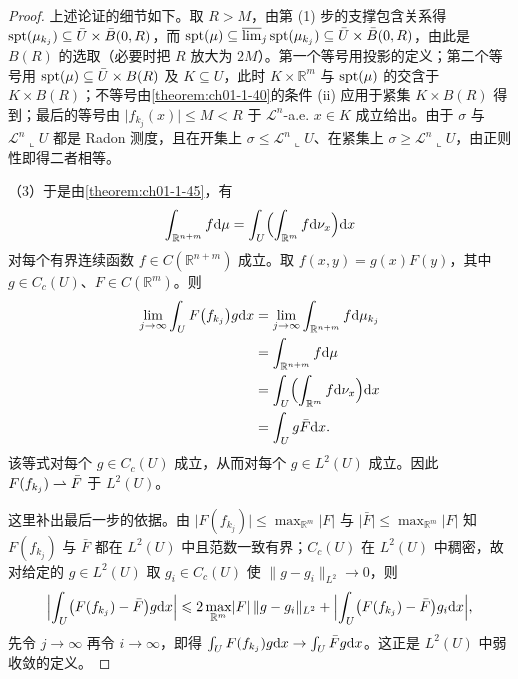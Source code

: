 \documentclass[../../main.tex]{subfiles}%
\begin{document}
\begin{proof}
上述论证的细节如下。取 $R>M$，由第 (1) 步的支撑包含关系得 $\operatorname{spt}(\mu_{k_j})\subseteq\bar U\times\bar B(0,R)$，而 $\operatorname{spt}(\mu)\subseteq\varlimsup_j\operatorname{spt}(\mu_{k_j})\subseteq\bar U\times\bar B(0,R)$，由此是 $B(R)$ 的选取（必要时把 $R$ 放大为 $2M$）。第一个等号用投影的定义；第二个等号用 $\operatorname{spt}(\mu)\subseteq\bar U\times B(R)$ 及 $K\subseteq U$，此时 $K\times\mathbb{R}^m$ 与 $\operatorname{spt}(\mu)$ 的交含于 $K\times B(R)$；不等号由\cref{theorem:ch01-1-40}的条件 (ii) 应用于紧集 $K\times B(R)$ 得到；最后的等号由 $\lvert f_{k_j}(x)\rvert\leqslant M<R$ 于 $\mathcal{L}^n$-a.e. $x\in K$ 成立给出。由于 $\sigma$ 与 $\mathcal{L}^n\llcorner U$ 都是 Radon 测度，且在开集上 $\sigma\leqslant\mathcal{L}^n\llcorner U$、在紧集上 $\sigma\geqslant\mathcal{L}^n\llcorner U$，由正则性即得二者相等。%

（3）于是由\cref{theorem:ch01-1-45}，有%
\begin{align*}
\int_{\mathbb{R}^{n+m}}f\mathrm{d}\mu=\int_U\Bigl(\int_{\mathbb{R}^m}f\mathrm{d}\nu_x\Bigr)\mathrm{d} x
\end{align*}
对每个有界连续函数 $f\in C(\mathbb{R}^{n+m})$ 成立。取 $f(x,y)=g(x)F(y)$，其中 $g\in C_c(U)$、$F\in C(\mathbb{R}^m)$。则
\begin{align*}
\lim_{j\to\infty}\int_UF\bigl(f_{k_j}\bigr)g\mathrm{d} x&=\lim_{j\to\infty}\int_{\mathbb{R}^{n+m}}f\mathrm{d}\mu_{k_j}\\
&=\int_{\mathbb{R}^{n+m}}f\mathrm{d}\mu\\
&=\int_U\Bigl(\int_{\mathbb{R}^m}f\mathrm{d}\nu_x\Bigr)\mathrm{d} x\\
&=\int_Ug\bar F\mathrm{d} x .
\end{align*}
该等式对每个 $g\in C_c(U)$ 成立，从而对每个 $g\in L^2(U)$ 成立。因此 $F(f_{k_j})\rightharpoonup\bar F$ 于 $L^2(U)$。

这里补出最后一步的依据。由 $\lvert F(f_{k_j})\rvert\leqslant\max_{\mathbb{R}^m}\lvert F\rvert$ 与 $\lvert\bar F\rvert\leqslant\max_{\mathbb{R}^m}\lvert F\rvert$ 知 $F(f_{k_j})$ 与 $\bar F$ 都在 $L^2(U)$ 中且范数一致有界；$C_c(U)$ 在 $L^2(U)$ 中稠密，故对给定的 $g\in L^2(U)$ 取 $g_i\in C_c(U)$ 使 $\lVert g-g_i\rVert_{L^2}\to0$，则
\begin{align*}
\Bigl\lvert\int_U\bigl(F(f_{k_j})-\bar F\bigr)g\mathrm{d} x\Bigr\rvert\leqslant 2\max_{\mathbb{R}^m}\lvert F\rvert\,\lVert g-g_i\rVert_{L^2}+\Bigl\lvert\int_U\bigl(F(f_{k_j})-\bar F\bigr)g_i\mathrm{d} x\Bigr\rvert,
\end{align*}
先令 $j\to\infty$ 再令 $i\to\infty$，即得 $\int_UF(f_{k_j})g\mathrm{d} x\to\int_U\bar Fg\mathrm{d} x$。这正是 $L^2(U)$ 中弱收敛的定义。
\end{proof}
\end{document}
